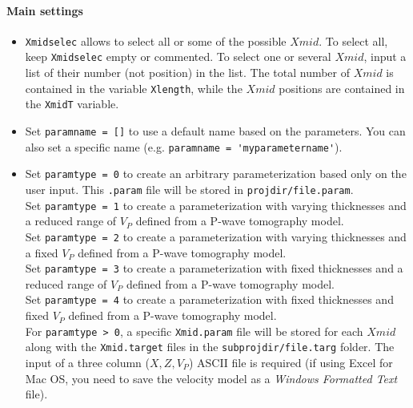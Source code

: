 \documentclass[twoside,a4paper]{article}
\begin{document}
\paragraph{Main settings}
\begin{itemize}[leftmargin=*]
\setlength\itemsep{2ex}
\item \verb|Xmidselec| allows to select all or some of the possible $Xmid$. To select all, keep \verb|Xmidselec| empty or commented. To select one or several $Xmid$, input a list of their number (not position) in the list. The total number of $Xmid$ is contained in the variable \verb|Xlength|, while the $Xmid$ positions are contained in the \verb|XmidT| variable.

\item Set \verb|paramname = []| to use a default name based on the parameters. You can also set a specific name (e.g. \verb|paramname = 'myparametername'|).

\item Set \verb|paramtype = 0| to create an arbitrary parameterization based only on the user input. This \verb|.param| file will be stored in \verb|projdir/file.param|.\\[1ex]
Set \verb|paramtype = 1| to create a parameterization with varying thicknesses and a reduced range of $V_P$ defined from a P-wave tomography model.\\[1ex]
Set \verb|paramtype = 2| to create a parameterization with varying thicknesses and a fixed $V_P$ defined from a P-wave tomography model.\\[1ex]
Set \verb|paramtype = 3| to create a parameterization with fixed thicknesses and a reduced range of $V_P$ defined from a P-wave tomography model.\\[1ex]
Set \verb|paramtype = 4| to create a parameterization with fixed thicknesses and fixed $V_P$ defined from a P-wave tomography model.\\[1ex]
For \verb|paramtype > 0|, a specific \verb|Xmid.param| file will be stored for each $Xmid$ along with the \verb|Xmid.target| files in the \verb|subprojdir/file.targ| folder. The input of a three column ($X,Z,V_P$) ASCII file is required (if using Excel for Mac OS, you need to save the velocity model as a \textit{Windows Formatted Text} file).
\end{itemize}
\end{document}
